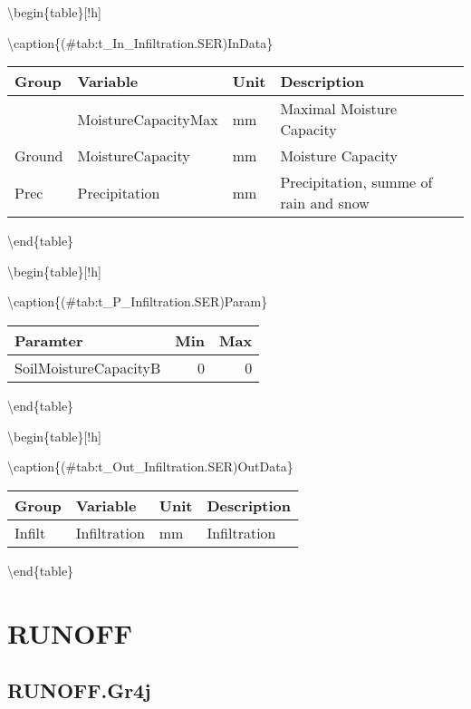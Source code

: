 \documentclass[
]{book}
\begin{document}
\textbackslash begin\{table\}{[}!h{]}

\textbackslash caption\{(\#tab:t\_In\_Infiltration.SER)InData\}
\centering

\begin{tabular}[t]{l|l|l|l}
\hline
Group & Variable & Unit & Description\\
\hline
 & MoistureCapacityMax & mm & Maximal Moisture Capacity\\
\cline{2-4}
\multirow{-2}{*}{\raggedright\arraybackslash Ground} & MoistureCapacity & mm & Moisture Capacity\\
\cline{1-4}
Prec & Precipitation & mm & Precipitation, summe of rain and snow\\
\hline
\end{tabular}

\textbackslash end\{table\}

\textbackslash begin\{table\}{[}!h{]}

\textbackslash caption\{(\#tab:t\_P\_Infiltration.SER)Param\}
\centering

\begin{tabular}[t]{l|r|r}
\hline
Paramter & Min & Max\\
\hline
SoilMoistureCapacityB & 0 & 0\\
\hline
\end{tabular}

\textbackslash end\{table\}

\textbackslash begin\{table\}{[}!h{]}

\textbackslash caption\{(\#tab:t\_Out\_Infiltration.SER)OutData\}
\centering

\begin{tabular}[t]{l|l|l|l}
\hline
Group & Variable & Unit & Description\\
\hline
Infilt & Infiltration & mm & Infiltration\\
\hline
\end{tabular}

\textbackslash end\{table\}

\hypertarget{runoff}{%
\section{RUNOFF}\label{runoff}}

\hypertarget{runoff.gr4j}{%
\subsection{RUNOFF.Gr4j}\label{runoff.gr4j}}
\end{document}
